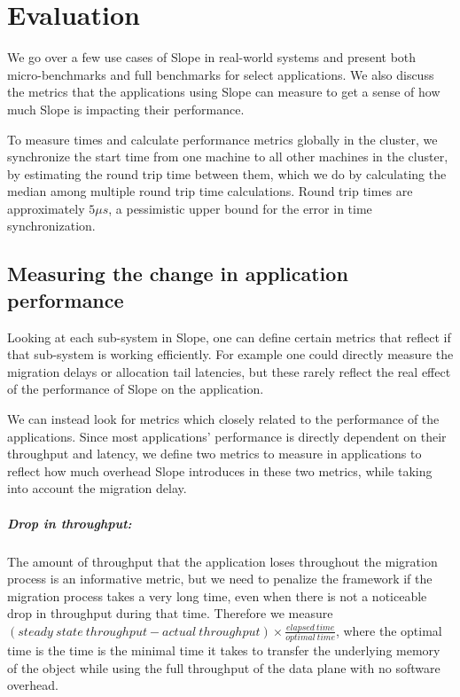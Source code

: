 \chapter{Evaluation}
\label{chap:evaluation}

We go over a few use cases of Slope in real-world systems and present both
micro-benchmarks and full benchmarks for select applications. We also discuss
the metrics that the applications using Slope can measure to get a sense of
how much Slope is impacting their performance.

To measure times and calculate performance metrics globally in the cluster,
we synchronize the start time from one machine to all other machines in the
cluster, by estimating the round trip time between them, which we do by
calculating the median among multiple round trip time calculations. Round
trip times are approximately $5 {\mu}{s}$, a pessimistic upper bound for the
error in time synchronization.

\section{Measuring the change in application performance}
Looking at each sub-system in Slope, one can define certain metrics that
reflect if that sub-system is working efficiently. For example one could
directly measure the migration delays or allocation tail latencies, but these
rarely reflect the real effect of the performance of Slope on the application.

We can instead look for metrics which closely related to the performance of
the applications. Since most applications' performance is
directly dependent on their throughput and latency, we define two metrics to
measure in applications to reflect how much overhead Slope introduces in these
two metrics, while taking into account the migration delay.

\paragraph{Drop in throughput:}
The amount of throughput that the application loses throughout the migration
process is an informative metric, but we need to penalize the framework if
the migration process takes a very long time, even when there is not a
noticeable drop in throughput during that time. Therefore we measure
$(steady\ state\ throughput - actual\ throughput) \times \frac{elapsed\ time}{optimal\ time}$, where the optimal time is the time is the minimal time it takes to transfer
the underlying memory of the object while using the full throughput of the
data plane with no software overhead.

